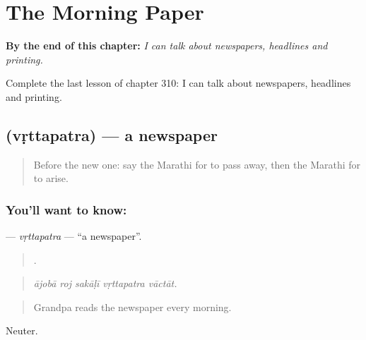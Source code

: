
\chapter{The Morning Paper}
\label{ch:mr-the-morning-paper}

\begin{chapteropening}
\textbf{By the end of this chapter:} \emph{I can talk about newspapers, headlines and printing.}

Complete the last lesson of chapter 310: I can talk about newspapers, headlines and printing.
\end{chapteropening}

\section[\texorpdfstring{\mr{वृत्तपत्र} (vṛttapatra)}{वृत्तपत्र (vṛttapatra)}]{ (vṛttapatra) — a newspaper}

\label{lesson:MR-C310-vrttapatra}



\begin{quote}
Before the new one: say the Marathi for to pass away, then the Marathi for to arise.
\end{quote}

\subsection*{You'll want to know: }
\textbf{} — \emph{vṛttapatra} — \textquotedblleft{}a newspaper\textquotedblright{}.

\begin{quote}
    .
\end{quote}

\begin{quote}
\emph{ājobā roj sakāḷī vṛttapatra vāctāt.}
\end{quote}

\begin{quote}
Grandpa reads the newspaper every morning.
\end{quote}

Neuter.

